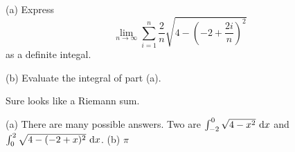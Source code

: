 \subsection*{\Application}

\begin{Mquestion}[2016Q1]
\noindent (a)
Express
\begin{equation*}
\lim_{n\rightarrow\infty}
     \sum_{i=1}^n\frac{2}{n}\sqrt{4-\left(-2+\frac{2i}{n}\right)^2}
\end{equation*}
as a definite integal.

\noindent (b)
Evaluate the integral of part (a).
\end{Mquestion}

\begin{hint}
Sure looks like a Riemann sum.
\end{hint}

\begin{answer}
(a) There are many possible answers. Two are
        $\int_{-2}^0 \sqrt{4-x^2}\,\,\mathrm{d}x$ and
        $\int_0^2 \sqrt{4-(-2+x)^2}\,\,\mathrm{d}x$.
\noindent
(b) $\pi$
\end{answer}

